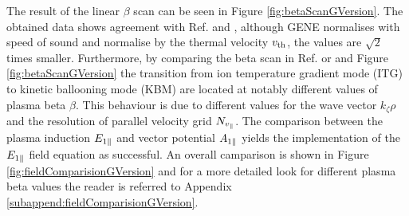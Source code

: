 
The result of the linear $\beta$ scan can be seen in Figure \ref{fig:betaScanGVersion}. The obtained data shows agreement with Ref.  and , although GENE normalises with speed of sound and {\gkw} normalise by the thermal velocity $v_\mathrm{th}$, the values are $\sqrt{2}$ times smaller. Furthermore, by comparing the beta scan in Ref.  or  and Figure \ref{fig:betaScanGVersion} the transition from ion temperature gradient mode (ITG) to kinetic ballooning mode (KBM) are located at notably different values of plasma beta $\beta$. This behaviour is due to different values for the wave vector $k_\zeta \rho$ and the resolution of parallel velocity grid $N_{v_\parallel}$. The comparison between the plasma induction $E_{1\parallel}$ and vector potential $A_{1\parallel}$ yields the implementation of the $E_{1\parallel}$ field equation as successful. An overall camparison is shown in Figure \ref{fig:fieldComparisionGVersion} and for a more detailed look for different plasma beta values the reader is referred to Appendix \ref{subappend:fieldComparisionGVersion}.



\newpage